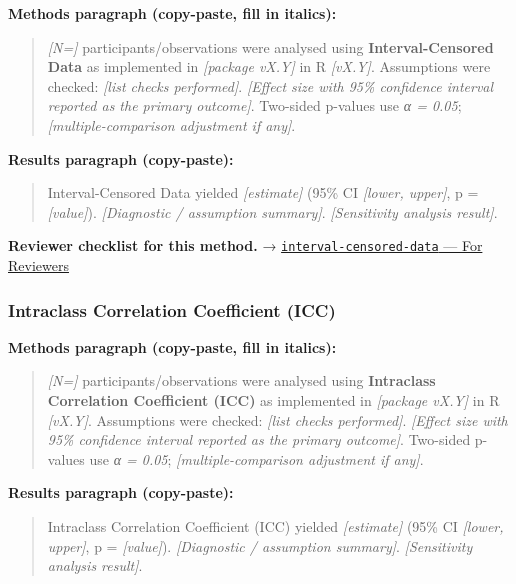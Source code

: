 \documentclass[
]{article}
\begin{document}
\textbf{Methods paragraph (copy-paste, fill in italics):}

\begin{quote}
\emph{{[}N={]}} participants/observations were analysed using
\textbf{Interval-Censored Data} as implemented in \emph{{[}package
vX.Y{]}} in R \emph{{[}vX.Y{]}}. Assumptions were checked: \emph{{[}list
checks performed{]}}. \emph{{[}Effect size with 95\% confidence interval
reported as the primary outcome{]}}. Two-sided p-values use \emph{α =
0.05}; \emph{{[}multiple-comparison adjustment if any{]}}.
\end{quote}

\textbf{Results paragraph (copy-paste):}

\begin{quote}
Interval-Censored Data yielded \emph{{[}estimate{]}} (95\% CI
\emph{{[}lower, upper{]}}, p = \emph{{[}value{]}}). \emph{{[}Diagnostic
/ assumption summary{]}}. \emph{{[}Sensitivity analysis result{]}}.
\end{quote}

\textbf{Reviewer checklist for this method.} →
\href{../chapters/11-survival/interval-censored-data.Rmd\#for-reviewers}{\texttt{interval-censored-data}
--- For Reviewers}

\subsubsection{Intraclass Correlation Coefficient
(ICC)}\label{intraclass-correlation-coefficient-icc}

\textbf{Methods paragraph (copy-paste, fill in italics):}

\begin{quote}
\emph{{[}N={]}} participants/observations were analysed using
\textbf{Intraclass Correlation Coefficient (ICC)} as implemented in
\emph{{[}package vX.Y{]}} in R \emph{{[}vX.Y{]}}. Assumptions were
checked: \emph{{[}list checks performed{]}}. \emph{{[}Effect size with
95\% confidence interval reported as the primary outcome{]}}. Two-sided
p-values use \emph{α = 0.05}; \emph{{[}multiple-comparison adjustment if
any{]}}.
\end{quote}

\textbf{Results paragraph (copy-paste):}

\begin{quote}
Intraclass Correlation Coefficient (ICC) yielded \emph{{[}estimate{]}}
(95\% CI \emph{{[}lower, upper{]}}, p = \emph{{[}value{]}}).
\emph{{[}Diagnostic / assumption summary{]}}. \emph{{[}Sensitivity
analysis result{]}}.
\end{quote}
\end{document}
